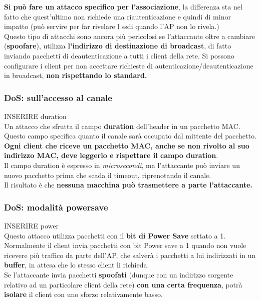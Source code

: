 \documentclass[12pt]{article}
\begin{document}
				\textbf{Si può fare un attacco specifico per l'associazione}, la differenza sta nel fatto che quest'ultimo non richiede una riautenticazione e quindi di minor impatto (può servire per far rivelare l ssdi quando l'AP non lo rivela.)\\
				Questo tipo di attacchi sono ancora più pericolosi se l'attaccante oltre a cambiare (\textbf{spoofare}), utilizza \textbf{l'indirizzo di destinazione di broadcast}, di fatto inviando pacchetti di deautenticazione a tutti i client della rete. Si possono configurare i client per non accettare richieste di autenticazione/deautenticazione in broadcast,\textbf{ non rispettando lo standard.} 
			\subsubsection{DoS: sull'accesso al canale}
				
				INSERIRE duration\\
				
				Un attacco che sfrutta il campo \textbf{duration} dell'header in un pacchetto MAC. Questo campo specifica quanto il canale sarà occupato dal mittente del pacchetto. \textbf{Ogni client che riceve un pacchetto MAC, anche se non rivolto al suo indirizzo MAC, deve leggerlo e rispettare il campo duration}.\\
				Il campo duration è espresso in \textit{microsecondi}, ma l'attaccante può inviare un nuovo pacchetto prima che scada il timeout, riprenotando il canale.\\
				Il risultato è che \textbf{nessuna macchina può trasmettere a parte l'attaccante.}
			\subsubsection{DoS: modalità powersave}
			
				INSERIRE power\\
				
				Questo attacco utilizza pacchetti con il \textbf{bit di Power Save} settato a 1. Normalmente il client invia pacchetti con bit Power save a 1 quando non vuole ricevere più traffico da parte dell'AP, che salverà i pacchetti a lui indirizzati in un \textbf{buffer}, in attesa che lo stesso client li richieda.\\
				Se l'attaccante invia pacchetti \textbf{spoofati} (dunque con un indirizzo sorgente relativo ad un particolare client della rete) \textbf{con una certa frequenza}, potrà \textbf{isolare} il client con uno sforzo relativamente basso.
			
\end{document}
